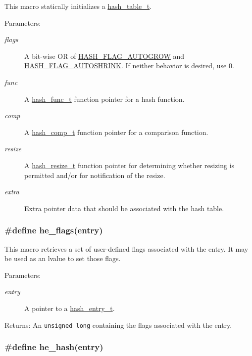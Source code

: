 This macro statically initializes a \hyperlink{group__dbprim__hash_a0}{hash\_\-table\_\-t}.

\begin{Desc}
\item[Parameters:]
\begin{description}
\item[{\em flags}]A bit-wise OR of \hyperlink{group__dbprim__hash_a16}{HASH\_\-FLAG\_\-AUTOGROW} and \hyperlink{group__dbprim__hash_a17}{HASH\_\-FLAG\_\-AUTOSHRINK}. If neither behavior is desired, use 0. \item[{\em func}]A \hyperlink{group__dbprim__hash_a3}{hash\_\-func\_\-t} function pointer for a hash function. \item[{\em comp}]A \hyperlink{group__dbprim__hash_a4}{hash\_\-comp\_\-t} function pointer for a comparison function. \item[{\em resize}]A \hyperlink{group__dbprim__hash_a5}{hash\_\-resize\_\-t} function pointer for determining whether resizing is permitted and/or for notification of the resize. \item[{\em extra}]Extra pointer data that should be associated with the hash table. \end{description}
\end{Desc}
\hypertarget{group__dbprim__hash_a32}{
\subsubsection[he\_\-flags]{\setlength{\rightskip}{0pt plus 5cm}\#define he\_\-flags(entry)}}
\label{group__dbprim__hash_a32}


This macro retrieves a set of user-defined flags associated with the entry. It may be used as an lvalue to set those flags.

\begin{Desc}
\item[Parameters:]
\begin{description}
\item[{\em entry}]A pointer to a \hyperlink{group__dbprim__hash_a1}{hash\_\-entry\_\-t}.\end{description}
\end{Desc}
\begin{Desc}
\item[Returns:]An {\tt unsigned long} containing the flags associated with the entry. \end{Desc}
\hypertarget{group__dbprim__hash_a34}{
\subsubsection[he\_\-hash]{\setlength{\rightskip}{0pt plus 5cm}\#define he\_\-hash(entry)}}
\label{group__dbprim__hash_a34}


